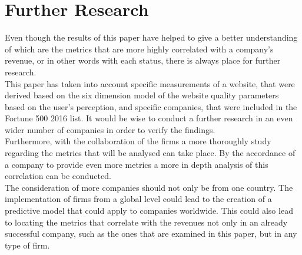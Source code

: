 \documentclass{book}
\begin{document}
\chapter{Further Research}
Even though the results of this paper have helped to give a better understanding of which are the metrics that are more highly correlated with a company's revenue, or in other words with each status, there is always place for further research.\\
This paper has taken into account specific measurements of a website, that were derived based on the six dimension model of the website quality parameters based on the user's perception, and specific companies, that were included in the Fortune 500 2016 list. It would be wise to conduct a further research in an even wider number of companies in order to verify the findings.\\ Furthermore, with the collaboration of the firms a more thoroughly study regarding the metrics that will be analysed can take place. By the accordance of a company to provide even more metrics a more in depth analysis of this correlation can be conducted.\\
The consideration of more companies should not only be from one country. The implementation of firms from a global level could lead to the creation of a predictive model that could apply to companies worldwide. This could also lead to locating the metrics that correlate with the revenues not only in an already successful company, such as the ones that are examined in this paper, but in any type of firm.
\pagebreak
\end{document}
